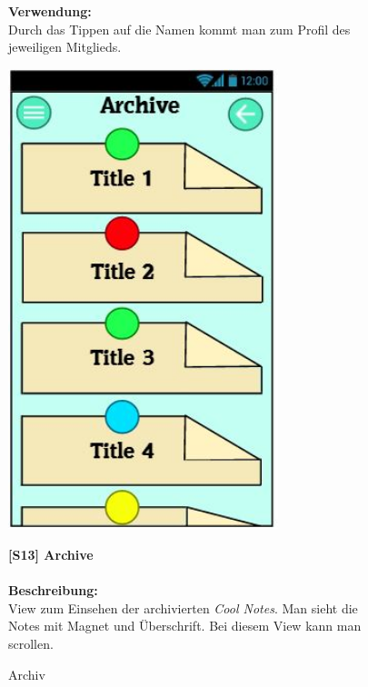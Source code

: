 \documentclass[a4paper]{scrreprt}
\begin{document}
\begin{figure}[h!]
\begin{minipage}[t]{0.65\linewidth}
\begin{itemize}
    			\end{itemize}
    			
    			\hfill 
    			
    			\textbf{Verwendung:}\\
    			Durch das Tippen auf die Namen kommt man 
    			zum Profil des jeweiligen Mitglieds.
    			   			
    			
    		\end{minipage}
    	\end{figure}
    	\clearpage
    	
    	\begin{figure}[h]
    		\begin{minipage}[b]{0.37\linewidth}
    			\flushright
    			\centering
    			\includegraphics[width=0.7\textwidth]{fridget_archive.JPG}
    			\caption{Archiv}
    			\label{fig:figure1}
    			\vspace{22mm}
    		\end{minipage}
    		\hspace{0.5cm}
    		\begin{minipage}[b]{0.6\linewidth}
    			\flushleft
    			\textbf{{[}S13{]} Archive} \\
    			\hfill
    			\\\textbf{Beschreibung:} \\
    			View zum Einsehen der archivierten \textit{Cool Notes}.
    			Man sieht die Notes mit Magnet und Überschrift.
    			Bei diesem View kann man scrollen.\\
    			

\end{minipage}
\end{figure}
\end{document}
